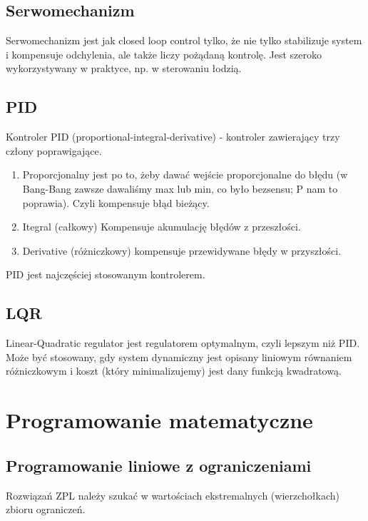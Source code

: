 \documentclass[12pt]{article}
\begin{document}
\subsection{Serwomechanizm}
Serwomechanizm jest jak closed loop control tylko, że nie tylko stabilizuje system i kompensuje odchylenia, ale także liczy pożądaną kontrolę. Jest szeroko wykorzystywany w praktyce, np. w sterowaniu łodzią.

\subsection{PID}
Kontroler PID (proportional-integral-derivative) - kontroler zawierający trzy człony poprawigające. 
\begin{enumerate}
	\item Proporcjonalny jest po to, żeby dawać wejście proporcjonalne do błędu (w Bang-Bang zawsze dawaliśmy max lub min, co było bezsensu; P nam to poprawia). Czyli kompensuje błąd bieżący.
	\item Itegral (całkowy) Kompensuje akumulację błędów z przeszłości.
	\item Derivative (różniczkowy) kompensuje przewidywane błędy w przyszłości.
\end{enumerate}
PID jest najczęściej stosowanym kontrolerem.

\subsection{LQR}
Linear-Quadratic regulator jest regulatorem optymalnym, czyli lepszym niż PID. Może być stosowany, gdy system dynamiczny jest opisany liniowym równaniem różniczkowym i koszt (który minimalizujemy) jest dany funkcją kwadratową.

\section{Programowanie matematyczne}
\subsection{Programowanie liniowe z ograniczeniami}
Rozwiązań ZPL należy szukać w wartościach ekstremalnych (wierzchołkach) zbioru ograniczeń.\\
\end{document}
